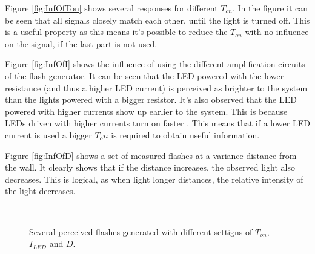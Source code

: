 Figure \ref{fig:InfOfTon} shows several responses for different $T_{on}$. In the figure it can be seen that all signals closely match each other, until the light is turned off. This is a useful property as this means it's possible to reduce the $T_{on}$ with no influence on the signal, if the last part is not used.

Figure \ref{fig:InfOfI} shows the influence of using the different amplification circuits of the flash generator. It can be seen that the LED powered with the lower resistance (and thus a higher LED current) is perceived as brighter to the system than the lights powered with a bigger resistor. It's also observed that the LED powered with higher currents show up earlier to the system. This is because LEDs driven with higher currents turn on faster \cite{LED_on}. This means that if a lower LED current is used a bigger $T_on$ is required to obtain useful information.

Figure \ref{fig:InfOfD} shows a set of measured flashes at a variance distance from the wall. It clearly shows that if the distance increases, the observed light also decreases. This is logical, as when light longer distances, the relative intensity of the light decreases. 
\begin{figure}
	\centering     %
	\label{fig:InfOf}
	\\
	\caption{Several perceived flashes generated with different settigns of $T_{on}$, $I_{LED}$ and $D$.}
\end{figure}

